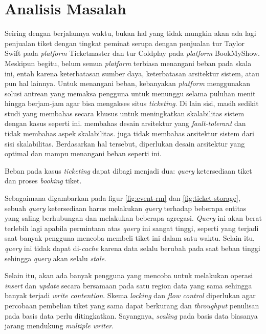 \section{Analisis Masalah}

Seiring dengan berjalannya waktu, bukan hal yang tidak mungkin akan ada lagi penjualan tiket dengan tingkat peminat serupa dengan penjualan tur Taylor Swift pada \textit{platform} Ticketmaster dan tur Coldplay pada \textit{platform} BookMyShow. Meskipun begitu, belum semua \textit{platform} terbiasa menangani beban pada skala ini, entah karena keterbatasan sumber daya, keterbatasan arsitektur sistem, atau pun hal lainnya. Untuk menangani beban, kebanyakan \textit{platform} menggunakan solusi antrean yang memaksa pengguna untuk menunggu selama puluhan menit hingga berjam-jam agar bisa mengakses situs \textit{ticketing}. Di lain sisi, masih sedikit studi yang membahas secara khusus untuk meningkatkan skalabilitas sistem dengan kasus seperti ini. \cite{microservicesEventDriven} membahas desain arsitektur yang \textit{fault-tolerant} dan tidak membahas aspek skalabilitas. \cite{backendForTicketing} juga tidak membahas arsitektur sistem dari sisi skalabilitas. Berdasarkan hal tersebut, diperlukan desain arsitektur yang optimal dan mampu menangani beban seperti ini.

Beban pada kasus \textit{ticketing} dapat dibagi menjadi dua: \textit{query} ketersediaan tiket dan proses \textit{booking} tiket.

Sebagaimana digambarkan pada figur \ref{fig:event-rm} dan \ref{fig:ticket-storage}, sebuah \textit{query} ketersediaan harus melakukan \textit{query} terhadap beberapa entitas yang saling berhubungan dan melakukan beberapa agregasi. \textit{Query} ini akan berat terlebih lagi apabila permintaan atas \textit{query} ini sangat tinggi, seperti yang terjadi saat banyak pengguna mencoba membeli tiket ini dalam satu waktu. Selain itu, \textit{query} ini tidak dapat di-\textit{cache} karena data selalu berubah pada saat beban tinggi sehingga \textit{query} akan selalu \textit{stale}.

Selain itu, akan ada banyak pengguna yang mencoba untuk melakukan operasi \textit{insert} dan \textit{update} secara bersamaan pada satu region data yang sama sehingga banyak terjadi \textit{write contention}. Skema \textit{locking} dan \textit{flow control} diperlukan agar percobaan pembelian tiket yang sama dapat berkurang dan \textit{throughput} penulisan pada basis data perlu ditingkatkan. Sayangnya, \textit{scaling} pada basis data biasanya jarang mendukung \textit{multiple writer}.